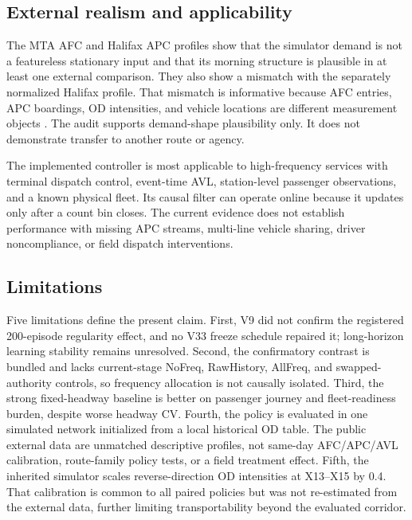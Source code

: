 \documentclass[preprint,12pt,authoryear,nopreprintline]{elsarticle}
\begin{document}
\subsection{External realism and
applicability}\label{external-realism-and-applicability}

The MTA AFC and Halifax APC profiles show that the simulator demand is
not a featureless stationary input and that its morning structure is
plausible in at least one external comparison. They also show a mismatch
with the separately normalized Halifax profile. That mismatch is
informative because AFC entries, APC boardings, OD intensities, and
vehicle locations are different measurement objects
\citep{pelletier2011smart}. The audit supports demand-shape plausibility
only. It does not demonstrate transfer to another route or agency.

The implemented controller is most applicable to high-frequency services
with terminal dispatch control, event-time AVL, station-level passenger
observations, and a known physical fleet. Its causal filter can operate
online because it updates only after a count bin closes. The current
evidence does not establish performance with missing APC streams,
multi-line vehicle sharing, driver noncompliance, or field dispatch
interventions.

\subsection{Limitations}\label{limitations}

Five limitations define the present claim. First, V9 did not confirm the
registered 200-episode regularity effect, and no V33 freeze schedule
repaired it; long-horizon learning stability remains unresolved. Second,
the confirmatory contrast is bundled and lacks current-stage NoFreq,
RawHistory, AllFreq, and swapped-authority controls, so frequency
allocation is not causally isolated. Third, the strong fixed-headway
baseline is better on passenger journey and fleet-readiness burden,
despite worse headway CV. Fourth, the policy is evaluated in one
simulated network initialized from a local historical OD table. The
public external data are unmatched descriptive profiles, not same-day
AFC/APC/AVL calibration, route-family policy tests, or a field treatment
effect. Fifth, the inherited simulator scales reverse-direction OD
intensities at X13--X15 by 0.4. That calibration is common to all paired
policies but was not re-estimated from the external data, further
limiting transportability beyond the evaluated corridor.
\end{document}

